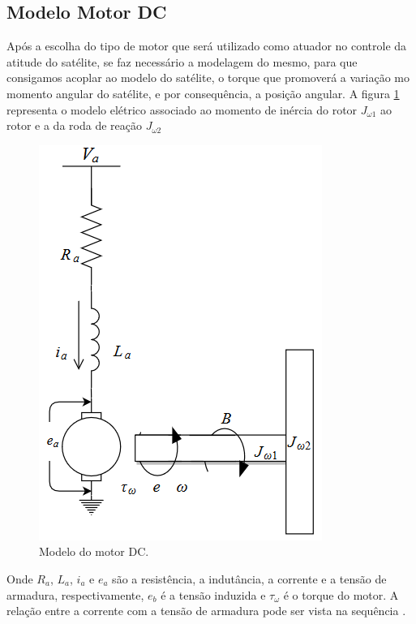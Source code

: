 \subsection{Modelo Motor DC}

Após a escolha do tipo de motor que será utilizado como atuador no controle da atitude do satélite, se faz necessário a modelagem do mesmo, para que consigamos acoplar ao modelo do satélite, o torque que promoverá a variação mo momento angular do satélite, e por consequência, a posição angular. A figura \ref{fig:modelo_motor_dc} representa o modelo elétrico associado ao momento de inércia do rotor $J_{\omega 1}$ ao rotor e a da roda de reação $J_{\omega 2}$

\begin{figure}[H]
  \caption{Modelo do motor DC.}
  \begin{center}
      \includegraphics[scale=.7]{metodologia/img/modelo_motor_dc}
  \end{center}
  \label{fig:modelo_motor_dc}
\end{figure}

Onde $R_a$, $L_a$, $i_a$ e $e_a$ são a resistência, a indutância, a corrente e a tensão de armadura, respectivamente, $e_b$ é a tensão induzida e $\tau_{\omega}$ é o torque do motor. A relação entre a corrente com a tensão de armadura pode ser vista na sequência \cite{Ogata}.

